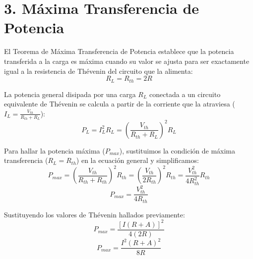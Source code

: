 \documentclass[12pt, a4paper]{article}
\begin{document}
\section*{3. Máxima Transferencia de Potencia}
El Teorema de Máxima Transferencia de Potencia establece que la potencia transferida a la carga es máxima cuando su valor se ajusta para ser exactamente igual a la resistencia de Thévenin del circuito que la alimenta:
\begin{equation}
    R_L = R_{th} = 2R
\end{equation}

La potencia general disipada por una carga $R_L$ conectada a un circuito equivalente de Thévenin se calcula a partir de la corriente que la atraviesa ($I_L = \frac{V_{th}}{R_{th} + R_L}$):
\begin{equation}
    P_L = I_L^2 R_L = \left( \frac{V_{th}}{R_{th} + R_L} \right)^2 R_L
\end{equation}

Para hallar la potencia máxima ($P_{max}$), sustituimos la condición de máxima transferencia ($R_L = R_{th}$) en la ecuación general y simplificamos:
\begin{equation*}
    P_{max} = \left( \frac{V_{th}}{R_{th} + R_{th}} \right)^2 R_{th} = \left( \frac{V_{th}}{2 R_{th}} \right)^2 R_{th} = \frac{V_{th}^2}{4 R_{th}^2} R_{th}
\end{equation*}
\begin{equation}
    P_{max} = \frac{V_{th}^2}{4 R_{th}}
\end{equation}

Sustituyendo los valores de Thévenin hallados previamente:
\begin{equation*}
    P_{max} = \frac{[I(R + A)]^2}{4(2R)}
\end{equation*}
\begin{equation}
    P_{max} = \frac{I^2(R + A)^2}{8R}
\end{equation}
\end{document}
